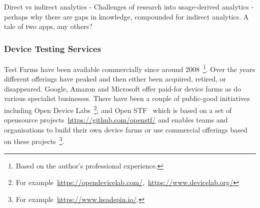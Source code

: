 Direct vs indirect analytics - 
Challenges of research into usage-derived analytics - perhaps why there are gaps in knowledge, compounded for indirect analytics. A tale of two apps, any others?

\subsubsection{Device Testing Services}
Test Farms have been available commercially since around 2008~\footnote{Based on the author's professional experience.}. Over the years different offerings have peaked and then either been acquired, retired, or disappeared. Google, Amazon and Microsoft offer paid-for device farms as do various specialist businesses. There have been a couple of public-good initiatives including Open Device Labs~\footnote{For example~\url{https://opendevicelab.com/},~\url{https://www.devicelab.org/}}; and Open STF~\cite{openstf_website} which is based on a set of opensource projects~\url{https://github.com/openstf/} and enables teams and organisations to build their own device farms or use commercial offerings based on these projects~\footnote{For example~\url{https://www.headspin.io/}.}.
